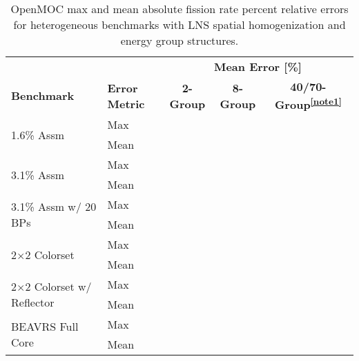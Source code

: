 \begin{table}[ht!]
  \centering
  \caption[OpenMOC fission rate errors with LNS homogenization]{OpenMOC max and mean absolute fission rate percent relative errors for heterogeneous benchmarks with \ac{LNS} spatial homogenization and energy group structures.}
  \small
  \label{table:chap9-lns-fiss-rates}
  \vspace{6pt}
  \begin{tabular}{l l c c c}
  \toprule
  \rowcolor{lightgray}
  & & \multicolumn{3}{c}{\cellcolor{lightgray} \textbf{Mean Error [\%]}} \\
  \multirow{-2}{*}{\cellcolor{lightgray} \bf Benchmark} &
  \multirow{-2}{*}{\cellcolor{lightgray} \bf Error Metric} &
  \multicolumn{1}{c}{{\cellcolor{lightgray} \bf 2-Group}} &
  \multicolumn{1}{c}{{\cellcolor{lightgray} \bf 8-Group}} &
  \multicolumn{1}{c}{{\cellcolor{lightgray} \bf 40/70-Group\textsuperscript{\ref{note1}}}} \\
  \midrule
\multirow{2}{*}{\parbox{2.5cm}{1.6\% Assm}} & Max & & & \\
& Mean & & & \\
\midrule
\multirow{2}{*}{\parbox{2.5cm}{3.1\% Assm}} & Max & & & \\
& Mean & & & \\
\midrule
\multirow{2}{*}{\parbox{2.5cm}{3.1\% Assm w/ 20 BPs}} & Max & & & \\
& Mean & & & \\
\midrule
\multirow{2}{*}{\parbox{2.5cm}{2$\times$2 Colorset}} & Max & & & \\
& Mean & & & \\
\midrule
\multirow{2}{*}{\parbox{2.5cm}{2$\times$2 Colorset w/ Reflector}} & Max & & & \\
& Mean & & & \\
\midrule
\multirow{2}{*}{\parbox{2.5cm}{BEAVRS Full Core}} & Max & & & \\
& Mean & & & \\
\bottomrule
\end{tabular}
\end{table}


